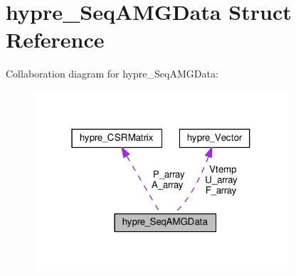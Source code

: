 \hypertarget{structhypre__SeqAMGData}{}\section{hypre\+\_\+\+Seq\+A\+M\+G\+Data Struct Reference}
\label{structhypre__SeqAMGData}


Collaboration diagram for hypre\+\_\+\+Seq\+A\+M\+G\+Data\+:
\nopagebreak
\begin{figure}[H]
\begin{center}
\leavevmode
\includegraphics[width=268pt]{structhypre__SeqAMGData__coll__graph}
\end{center}
\end{figure}
